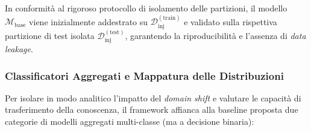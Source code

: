 In conformità al rigoroso protocollo di isolamento delle partizioni, il modello $\mathcal{M}_{\text{base}}$ viene inizialmente addestrato su $\mathcal{D}_{\text{inj}}^{(\text{train})}$ e validato sulla rispettiva partizione di test isolata $\mathcal{D}_{\text{inj}}^{(\text{test})}$, garantendo la riproducibilità e l'assenza di \textit{data leakage}.

\subsubsection{Classificatori Aggregati e Mappatura delle Distribuzioni}
\label{subsubsec:classificatori_aggregati}
Per isolare in modo analitico l'impatto del \textit{domain shift} e valutare le capacità di trasferimento della conoscenza, il framework affianca alla baseline proposta due categorie di modelli aggregati multi-classe (ma a decisione binaria):
